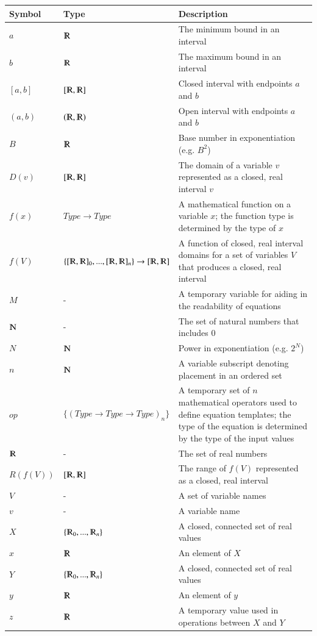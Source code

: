\documentclass[12pt]{article}
\begin{document}
\renewcommand{\arraystretch}{1.2}
\noindent \begin{longtable*}{m{1.5cm} m{5.3cm} m{8.2cm}} \toprule
\textbf{Symbol}  & \textbf{Type} & \textbf{Description}\\
\midrule 
\endhead
$a$ & $\varmathbb{R}$ & The minimum bound in an interval\\
$b$ & $\varmathbb{R}$ & The maximum bound in an interval\\
$[a,b]$ & $[\varmathbb{R}, \varmathbb{R}]$ & Closed interval with endpoints $a$ 
and $b$\\
$(a,b)$ & $(\varmathbb{R}, \varmathbb{R})$ & Open interval with endpoints $a$ 
and $b$\\
$B$ & $\varmathbb{R}$ & Base number in exponentiation (e.g. $B^2$)\\
$D(v)$ & $[\varmathbb{R}, \varmathbb{R}]$ & The domain of a variable $v$ 
represented as a closed, real interval $v$\\
$f(x)$ & $Type \rightarrow Type$ & A mathematical function on a variable $x$; 
the function type is determined by the type of $x$\\
$f(V)$ & $\{[\varmathbb{R}, \varmathbb{R}]_0, ..., [\varmathbb{R}, 
\varmathbb{R}]_n\} \rightarrow [\varmathbb{R}, 
\varmathbb{R}]$ & A function of closed, real interval domains for a set of 
variables $V$ that produces a closed, real interval\\
$M$ & - & A temporary variable for aiding in the readability of equations\\
$\varmathbb{N}$ & - & The set of natural numbers that includes 0\\
$N$ & $\varmathbb{N}$ & Power in exponentiation (e.g. $2^N$) \\
$n$ & $\varmathbb{N}$ & A variable subscript denoting placement in an ordered 
set\\
$op$ & $\{(Type \rightarrow Type \rightarrow Type)_n\}$ & A temporary set of $n$
mathematical operators used to define equation templates; the type of the 
equation is determined by the type of the input values\\
$\varmathbb{R}$ & - & The set of real numbers\\
$R(f(V))$ & $[\varmathbb{R}, \varmathbb{R}]$ & The range of $f(V)$ represented 
as a closed, real interval\\
$V$ & - & A set of variable names\\
$v$ & - & A variable name\\
$X$ & $\{\varmathbb{R}_0, ..., \varmathbb{R}_n\}$ & A closed, connected set of 
real values\\
$x$ & $\varmathbb{R}$ & An element of $X$\\
$Y$ & $\{\varmathbb{R}_0, ..., \varmathbb{R}_n\}$ & A closed, connected set of 
real values\\
$y$ & $\varmathbb{R}$ & An element of $y$\\
$z$ & $\varmathbb{R}$ & A temporary value used in operations between $X$ and 
$Y$\\
\bottomrule
\end{longtable*}
\end{document}
